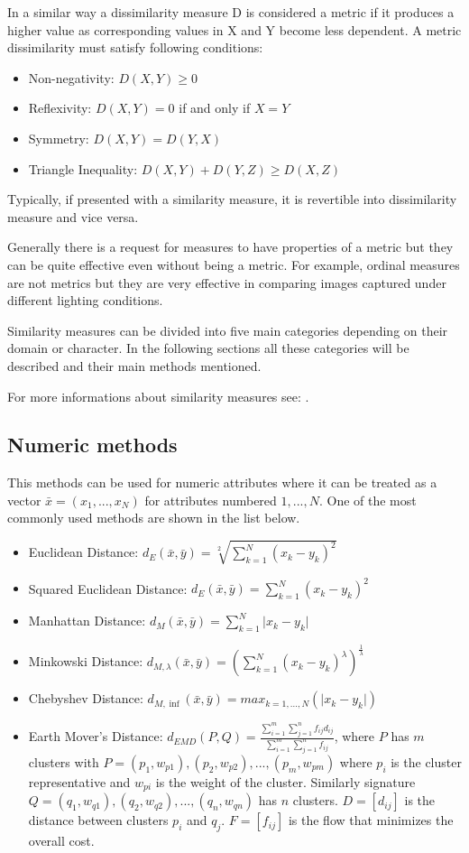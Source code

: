 In a similar way a dissimilarity measure D is considered a metric if it produces a higher value as corresponding values in X and Y become less dependent. A metric dissimilarity must satisfy following conditions:
\begin{itemize}
\item Non-negativity: $D(X,Y) \geq 0$
\item Reflexivity: $D(X,Y) = 0$ if and only if $X = Y$
\item Symmetry: $D(X,Y) = D(Y,X)$
\item Triangle Inequality: $D(X,Y) + D(Y,Z) \geq D(X,Z)$
\end{itemize}

Typically, if presented with a similarity measure, it is revertible into dissimilarity measure and vice versa.

Generally there is a request for measures to have properties of a metric but they can be quite effective even without being a metric. For example, ordinal measures are not metrics but they are very effective in comparing images captured under different lighting conditions.

Similarity measures can be divided into five main categories depending on their domain or character. In the following sections all these categories will be described and their main methods mentioned.

For more informations about similarity measures see: \cite{clusteringSimMeasure} \cite{simDissim} \cite{simMeasuresLecture}.

\subsection{Numeric methods}
This methods can be used for numeric attributes where it can be treated as a vector $\bar{x}=(x_1,...,x_N)$ for attributes numbered $1,...,N$. One of the most commonly used methods are shown in the list below.
\begin{itemize}
\item Euclidean Distance: $d_E (\bar{x},\bar{y})=\sqrt[2]{\sum_{k=1}^N (x_k-y_k)^2} $
\item Squared Euclidean Distance: $d_E (\bar{x},\bar{y})=\sum_{k=1}^N (x_k-y_k)^2 $
\item Manhattan Distance: $d_M (\bar{x},\bar{y})=\sum_{k=1}^N 
{\lvert x_k-y_k \rvert}$
\item Minkowski Distance: $d_{M,\lambda} (\bar{x},\bar{y})=(\sum_{k=1}^N (x_k-y_k)^\lambda)^{\frac{1}{\lambda}} $
\item Chebyshev Distance: $d_{M,\inf} (\bar{x},\bar{y})=max_{k=1,...,N}(\lvert x_k-y_k \rvert) $
\item Earth Mover's Distance: $d_{EMD}(P,Q)=\frac{\sum_{i=1}^m\sum_{j=1}^n f_{ij}d_{ij}}{\sum_{i=1}^m\sum_{j=1}^n f_{ij}}$, where $P$ has $m$ clusters with $P={(p_1, w_{p1}), (p_2, w_{p2}),...,(p_m, w_{pm})}$ where $p_i$ is the cluster representative and $w_{pi}$ is the weight of the cluster. Similarly signature $Q={(q_1, w_{q1}), (q_2, w_{q2}),...,(q_n, w_{qn})}$ has $n$ clusters. $D=[d_{ij}]$ is the distance between clusters $p_i$ and $q_j$. $F=[f_{ij}]$ is the flow that minimizes the overall cost.
\end{itemize}

